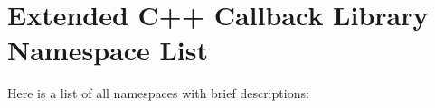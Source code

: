 \section{Extended C++ Callback Library Namespace List}
Here is a list of all namespaces with brief descriptions:\begin{CompactList}
\item{}
\item{}
\end{CompactList}
